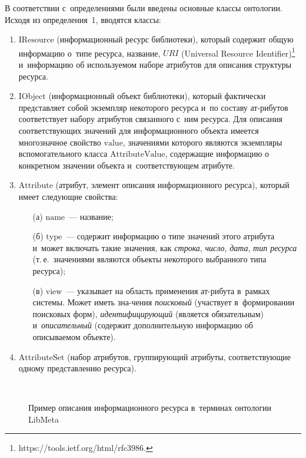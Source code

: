 \begin{multicols}{2}
     В соответствии с~определениями были введены основные классы 
онтологии. Исходя из определения~1, вводятся классы:
     \begin{enumerate}[1.]
\item $\mathrm{IResource}$ (информационный ресурс биб\-лио\-те\-ки), который 
содержит общую информацию о~типе ресурса, название, 
$URI$ (Universal Resource Identifier)\footnote{{\sf https://tools.ietf.org/html/rfc3986}.} и~информацию об 
ис\-поль\-зу\-емом наборе атрибутов для описания структуры ресурса.
\item $\mathrm{IObject}$ (информационный объект библиотеки), который 
фактически пред\-став\-ля\-ет собой экземпляр некоторого ресурса и~по 
составу ат-\linebreak рибутов соответствует набору атрибутов связанного с~ним 
ресурса. Для описания со\-от\-вет\-ст\-ву\-ющих значений для информационного 
объекта имеется многозначное свойство $\mathrm{value}$, значениями 
которого являются экземпляры вспомогательного класса $\mathrm{AttributeValue}$, 
содержащие информацию о конкретном значении объекта и~соответствующем атрибуте.
\item $\mathrm{Attribute}$ (атрибут, элемент описания информационного ресурса), 
который имеет следующие свойства:
\begin{itemize}
\item[(а)] $\mathrm{name}$~--- название;
\item[(б)] $\mathrm{type}$~--- содержит информацию о типе значений 
этого атрибута и~может включать такие значения, как 
\textit{строка}, \textit{число}, \textit{дата}, \textit{тип ресурса} 
(т.\,е.\ значениями являются объекты некоторого выбранного типа 
ресурса);
\item[(в)] $\mathrm{view}$~--- указывает на об\-ласть 
применения ат-\linebreak рибута в~рамках системы. Может иметь зна-\linebreak чения 
\textit{поисковый} 
(участвует в~формировании поисковых форм), 
\textit{иден\-ти\-фи\-ци\-ру\-ющий} (является обязательным) 
и~\textit{описательный} (содержит дополнительную информацию 
об описываемом объекте).
\end{itemize}
\item $\mathrm{AttributeSet}$ (набор атрибутов, группирующий атрибуты, 
со\-от\-вет\-ст\-ву\-ющие одному пред\-став\-ле\-нию ресурса).
\end{enumerate}

\begin{figure*}[b] %
\vspace*{1pt}
 \begin{center}
 \mbox{%
 \epsfxsize=105.266mm 
 }
 \end{center}
\vspace*{-9pt}
\caption{Пример описания информационного ресурса в~терминах онтологии LibMeta}
\end{figure*}


\end{multicols}
